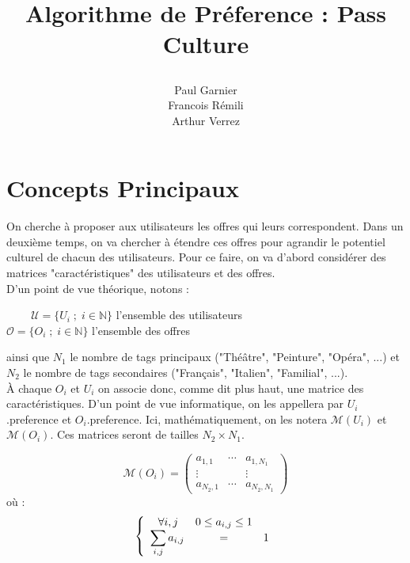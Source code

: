 \documentclass[11pt, oneside]{article}
\title{\begin{center} Algorithme de Préference : Pass Culture \end{center}}
\author{Paul Garnier \\ Francois Rémili \\ Arthur Verrez}
\begin{document}
\maketitle


\pagestyle{empty}

\maketitle





\pagestyle{plain}

\section{Concepts Principaux}

On cherche à proposer aux utilisateurs les offres qui leurs correspondent. Dans un deuxième temps, on va chercher à étendre ces offres pour agrandir le potentiel culturel de chacun des utilisateurs. Pour ce faire, on va d'abord considérer des matrices "caractéristiques" des utilisateurs et des offres. \\

D'un point de vue théorique, notons :

\begin{center}

 $\;\;\;\;\;\;\;\;\mathcal{U} = \{U_i \; ; \; i \in \mathbb{N} \}$ l'ensemble des utilisateurs \\
$\mathcal{O} = \{O_i \; ; \; i \in \mathbb{N} \}$ l'ensemble des offres \\

\end{center}

ainsi que $N_1$ le nombre de tags principaux ("Théâtre", "Peinture", "Opéra", ...) et $N_2$ le nombre de tags secondaires ("Français", "Italien", "Familial", ...). \\

À chaque $O_i$ et $U_i$ on associe donc, comme dit plus haut, une matrice des caractéristiques. D'un point de vue informatique, on les appellera par $U_i$.preference et $O_i$.preference. Ici, mathématiquement, on les notera $\mathcal{M} (U_i)$ et $\mathcal{M} (O_i)$. Ces matrices seront de tailles $N_2 \times N_1$.

\begin{center}
\[
\mathcal{M} (O_i) =
\begin{pmatrix}
a_{1,1} & \cdots & a_{1,N_1} \\
\vdots & & \vdots \\
a_{N_2,1} & \cdots & a_{N_2,N_1}
\end{pmatrix}
\]
où :
\[
 \left \{
   \begin{array}{r c l}
      \forall i,j \; \; & 0 \leq a_{i,j} \leq 1 \\
      \displaystyle \sum_{i,j} a_{i,j} &=& 1 \\
   \end{array}
   \right .
\]
\end{center}
\end{document}
